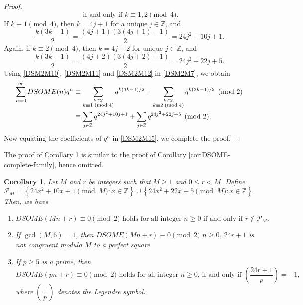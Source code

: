 \documentclass[12pt]{article}
\numberwithin{equation}{section}
\newtheorem{corollary}[theorem]{Corollary}
\theoremstyle{definition}
\theoremstyle{remark}
\numberwithin{equation}{section}
\begin{document}
\begin{proof}
\begin{equation}
\text{ if and only if }
k\equiv1,2\pmod4.
\end{equation}
If $k\equiv1\pmod4$, then $k=4j+1$ for a unique
$j\in\mathbb Z$, and
\begin{equation}\label{DSM2M11}
\dfrac{k(3k-1)}{2}
=
\dfrac{(4j+1)(3(4j+1)-1)}{2}
=
24j^2+10j+1.
\end{equation}
Again, if $k\equiv2\pmod4$, then $k=4j+2$ for  unique
$j\in\mathbb Z$, and
\begin{equation}\label{DSM2M12}
\dfrac{k(3k-1)}{2}
=
\dfrac{(4j+2)(3(4j+2)-1)}{2}
=
24j^2+22j+5.
\end{equation}
Using   \eqref{DSM2M10}, \eqref{DSM2M11} and \eqref{DSM2M12} in \eqref{DSM2M7}, we obtain
\begin{align}
\sum_{n=0}^{\infty}DSOME(n)q^n
&\equiv
\sum_{\substack{k\in\mathbb Z\\k\equiv1\;(\mathrm{mod}\;4)}}
q^{k(3k-1)/2}
+
\sum_{\substack{k\in\mathbb Z\\k\equiv2\;(\mathrm{mod}\;4)}}
q^{k(3k-1)/2}
\pmod2
\notag\\
&\label{DSM2M15}\equiv
\sum_{j\in\mathbb Z}
q^{24j^2+10j+1}
+
\sum_{j\in\mathbb Z}
q^{24j^2+22j+5}
\pmod2.
\end{align}
Now equating the  coefficients of
$q^n$ in \eqref{DSM2M15}, we complete the proof.
\end{proof}

The proof of Corollary \ref{crm2} is similar to the proof of Corollary \ref{cor:DSOME-complete-family}, hence omitted.

\begin{corollary}\label{crm2}
Let $M$ and $r$ be integers such that $M\geq 1$ and $0\leq r<M$. Define
$$\mathcal{P}_{M}
=
\left\{
24x^{2}+10x+1\pmod{M}:x\in\mathbb{Z}
\right\}
\cup
\left\{
24x^{2}+22x+5\pmod{M}:x\in\mathbb{Z}
\right\}.$$
Then, we have
\begin{enumerate}
\item[$(i)$]
$DSOME(Mn+r)\equiv0\pmod2
\text{ holds for all integer $n\geq0$ if and only if }
r\notin\mathcal{P}_{M}.$
\item[$(ii)$] If $\gcd(M,6)=1$, then 
$DSOME(Mn+r)\equiv0\pmod2$
 $n\geq0$, 
$24r+1$ is not congruent modulo $M$ to a perfect square.
\item[$(iii)$] If $p\geq5$ is a prime, then
$$DSOME(pn+r)\equiv0\pmod2
\text{ holds for all integer $n\geq0$, if and only if }
\left(\dfrac{24r+1}{p}\right)=-1, $$
where $\left(\dfrac{\cdot}{p}\right)$ denotes the Legendre symbol.
\end{enumerate}
\end{corollary}
\end{document}
